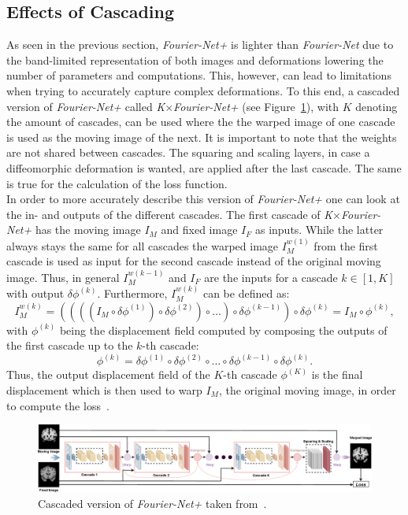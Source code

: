 \documentclass[english,version-2022-01]{uzl-thesis} %
\begin{document}
\subsection{Effects of Cascading} \label{SubSec:EffectsCascading}
As seen in the previous section, \emph{Fourier-Net+} is lighter than \emph{Fourier-Net} due to the band-limited representation of both images and deformations lowering the number of parameters and computations. This, however, can lead to limitations when trying to accurately capture complex deformations. To this end, a cascaded version of \emph{Fourier-Net+} called \emph{K$\times$Fourier-Net+} (see Figure~\ref{fig:Fourier-Net+Cascaded}), with $K$ denoting the amount of cascades, can be used where the the warped image of one cascade is used as the moving image of the next. It is important to note that the weights are not shared between cascades. The squaring and scaling layers, in case a diffeomorphic deformation is wanted, are applied after the last cascade. The same is true for the calculation of the loss function.\\
In order to more accurately describe this version of \emph{Fourier-Net+} one can look at the in- and outputs of the different cascades. The first cascade of \emph{K$\times$Fourier-Net+} has the moving image $I_M$ and fixed image $I_F$ as inputs. While the latter always stays the same for all cascades the warped image $I_M^{w(1)}$ from the first cascade is used as input for the second cascade instead of the original moving image. Thus, in general $I_M^{w(k-1)}$ and $I_F$ are the inputs for a cascade $k \in [1, K]$ with output $\delta \phi^{(k)}$. Furthermore, $I_M^{w(k)}$ can be defined as:
\begin{equation}
	I_M^{w(k)} = ((((I_M \circ \delta \phi^{(1)}) \circ \delta \phi^{(2)}) \circ \dots ) \circ \delta \phi^{(k-1)}) \circ \delta \phi^{(k)} = I_M \circ  \phi^{(k)},
\end{equation}
with $\phi^{(k)}$ being the displacement field computed by composing the outputs of the first cascade up to the $k$-th cascade:
\begin{equation}
	\phi^{(k)} = \delta \phi^{(1)} \circ \delta \phi^{(2)} \circ \dots \circ \delta \phi^{(k-1)} \circ \delta \phi^{(k)}.
\end{equation}
Thus, the output displacement field of the $K$-th cascade $\phi^{(K)}$ is the final displacement which is then used to warp $I_M$, the original moving image, in order to compute the loss~\cite{Fourier-Net+}.

\begin{figure}[htpb]
	\centering
	\graphicspath{{images/}{\main/images/}}
	\includegraphics[width=\linewidth]{ArchitectureFourier-Net+Cascaded.png} 
	\caption{Cascaded version of \emph{Fourier-Net+} taken from~\cite{Fourier-Net+}.}
	\label{fig:Fourier-Net+Cascaded}
\end{figure}
\end{document}
